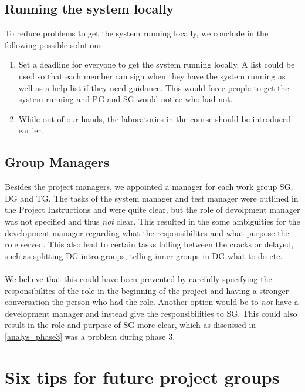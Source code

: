\documentclass{article}
\begin{document}
    \subsection{Running the system locally}
        To reduce problems to get the system running locally, 
        we conclude in the following possible solutions:
        \begin{enumerate}
            \item Set a deadline for everyone to get the system running locally. 
                    A list could be used so that each member can sign when they have
                    the system running as well as a help list if they need guidance.
                    This would force people to get the system running and PG and SG
                    would notice who had not.
            \item While out of our hands, the laboratories in the course should be introduced earlier.
        \end{enumerate}
        
    \subsection{Group Managers}
        Besides the project managers, we appointed a manager for each work group SG, DG and TG. The tasks of the system manager and test manager were outlined in the Project Instructions and were quite clear, but the role of devolpment manager was not specified and thus \emph{not} clear.
        This resulted in the some ambiguities for the development manager regarding what the responsibilites and what purpose the role served. This also lead to certain tasks falling between the cracks or 
        delayed, such as splitting DG intro groups, telling inner groups in DG what to do etc.
        \\ \\
        We believe that this could have been prevented by carefully specifying the responsibilites of the
        role in the beginning of the project and having a stronger conversation the person who had the role.
        Another option would be to \emph{not} have a development manager
        and instead give the responsibilities to SG. This could also result in the role and purpose of 
        SG more clear, which as discussed in \ref{analys_phase3} was a problem during phase 3.
        
\section{Six tips for future project groups \label{tips}}
\end{document}

